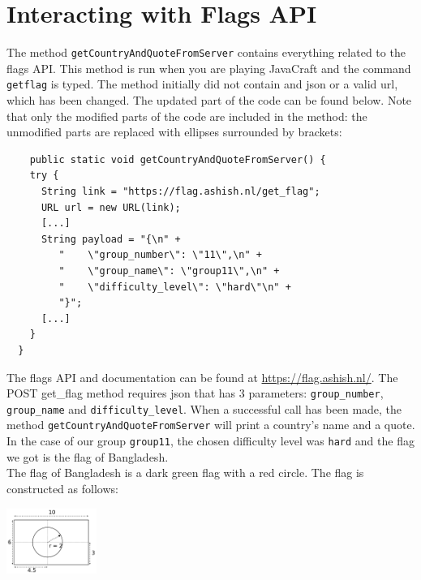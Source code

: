 \section{Interacting with Flags API} \label{section: api}

The method \texttt{getCountryAndQuoteFromServer} contains everything related to the flags API. This method is run when you are playing JavaCraft and the command \texttt{getflag} is typed. The method initially did not contain and json or a valid url, which has been changed. The updated part of the code can be found below. Note that only the modified parts of the code are included in the method: the unmodified parts are replaced with ellipses surrounded by brackets: 

\begin{lstlisting}
    public static void getCountryAndQuoteFromServer() {
    try {
      String link = "https://flag.ashish.nl/get_flag";
      URL url = new URL(link);
      [...]
      String payload = "{\n" +
         "    \"group_number\": \"11\",\n" +
         "    \"group_name\": \"group11\",\n" +
         "    \"difficulty_level\": \"hard\"\n" +
         "}";
      [...]
    }
  }
\end{lstlisting}

The flags API and documentation can be found at \url{https://flag.ashish.nl/}. The POST \/get\_flag method requires json that has 3 parameters: \texttt{group\_number}, \texttt{group\_name} and \texttt{difficulty\_level}. When a successful call has been made, the method \texttt{getCountryAndQuoteFromServer} will print a country's name and a quote. In the case of our group \texttt{group11}, the chosen difficulty level was \texttt{hard} and the flag we got is the flag of Bangladesh. \\

The flag of Bangladesh is a dark green flag with a red circle. The flag is constructed as follows:

\begin{center}
  {\includegraphics[height=80px]{../bangladesh-construct.png}}
\end{center}

